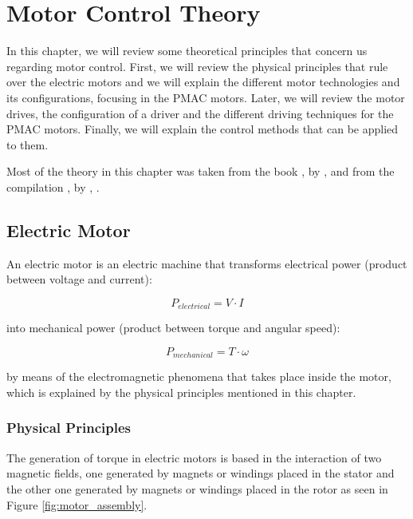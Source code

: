\chapter{Motor Control Theory} \label{chap:theory}

In this chapter, we will review some theoretical principles that concern us regarding motor control. First, we will review the physical principles that rule over the electric motors and we will explain the different motor technologies and its configurations, focusing in the \acf{PMAC} motors. Later, we will review the motor drives, the configuration of a driver and the different driving techniques for the \ac{PMAC} motors. Finally, we will explain the control methods that can be applied to them.

Most of the theory in this chapter was taken from the book , by \citeauthor{sistemi_di_controllo:2007}, \citeyear{sistemi_di_controllo:2007} and from the compilation , by \citeauthor{AC_drives}, \citeyear{AC_drives}.


\section{Electric Motor}

An electric motor is an electric machine that transforms electrical power (product between voltage and current):

\begin{equation}
	\label{eq:p_elec}
	P_{electrical} = V \cdot I
\end{equation}

into mechanical power (product between torque and angular speed):

\begin{equation}
	\label{eq:p_mech}
	P_{mechanical} = T \cdot \omega
\end{equation}

by means of the electromagnetic phenomena that takes place inside the motor, which is explained by the physical principles mentioned in this chapter.

\subsection{Physical Principles} \label{physical_principles}

The generation of torque in electric motors is based in the interaction of two magnetic fields, one generated by magnets or windings placed in the stator and the other one generated by magnets or windings placed in the rotor as seen in Figure \ref{fig:motor_assembly}.

